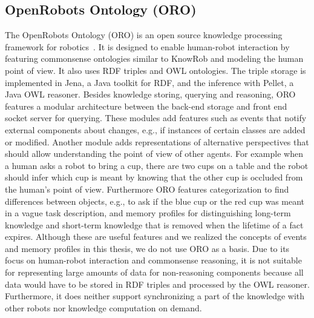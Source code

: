 \subsection{OpenRobots Ontology (ORO)}
\label{sec:oro}
The OpenRobots Ontology (ORO) is an open source knowledge processing
framework for robotics~\cite{Oro}. It is designed to enable
human-robot interaction by featuring commonsense ontologies similar to
KnowRob and modeling the human point of view. It also uses RDF triples
and OWL ontologies.  The triple storage is implemented in Jena, a Java
toolkit for RDF, and the inference with Pellet, a Java OWL
reasoner. Besides knowledge storing, querying and reasoning, ORO
features a modular architecture between the back-end storage and front
end socket server for querying. These modules add features such as
events that notify external components about changes, e.g., if
instances of certain classes are added or modified.
Another module adds representations of alternative perspectives that
should allow understanding the point of view of other agents.
For example when a human asks a robot to bring a
cup, there are two cups on a table and the robot should infer which
cup is meant by knowing that the other cup is occluded from the human's
point of view. Furthermore ORO features categorization to find
differences between objects, e.g., to ask if the blue cup or the red
cup was meant in a vague task description, and memory profiles for
distinguishing long-term knowledge and short-term knowledge that is
removed when the lifetime of a fact expires. Although these are useful
features and we realized the concepts of events and memory
profiles in this thesis, we do not use ORO as a basis. Due to its
focus on human-robot interaction and commonsense reasoning, it is not
suitable for representing large amounts of data for non-reasoning
components because all data would have to be stored in RDF triples and
processed by the OWL reasoner. Furthermore, it does neither support
synchronizing a part of the knowledge with other robots nor knowledge
computation on demand.

